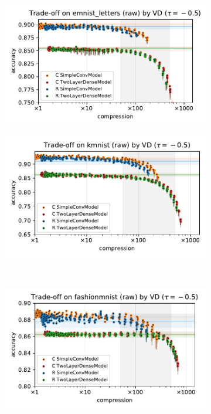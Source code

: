 \documentclass[a4paper,10pt,onecolumn]{article}
\begin{document}
\begin{figure}[b]
  \centering
  \begin{subfigure}[b]{0.5\columnwidth}
    \centering
    \includegraphics[width=\linewidth]{figure__mnist-like__trade-off/appendix__VD__emnist_letters__raw__-0.5.pdf}
  \end{subfigure}%
  \begin{subfigure}[b]{0.5\columnwidth}
    \centering
    \includegraphics[width=\linewidth]{figure__mnist-like__trade-off/appendix__VD__kmnist__raw__-0.5.pdf}
  \end{subfigure} \\%
  \begin{subfigure}[b]{0.5\columnwidth}
    \centering
    \includegraphics[width=\linewidth]{figure__mnist-like__trade-off/appendix__VD__fashionmnist__raw__-0.5.pdf}

\end{subfigure}
\end{figure}
\end{document}
